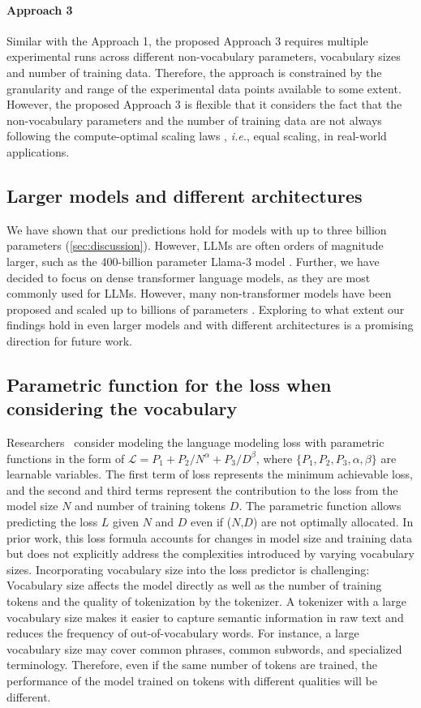 \paragraph{Approach 3}
Similar with the Approach 1, the proposed Approach 3 requires multiple experimental runs across different non-vocabulary parameters, vocabulary sizes and number of training data. Therefore, the approach is constrained by the granularity and range of the experimental data points available to some extent. However, the proposed Approach 3 is flexible that it considers the fact that the non-vocabulary parameters and the number of training data are not always following the compute-optimal scaling laws \citep{hoffmann2022training}, \textit{i.e.}, equal scaling, in real-world applications.

\subsection{Larger models and different architectures}

We have shown that our predictions hold for models with up to three billion parameters (\autoref{sec:discussion}). However, LLMs are often orders of magnitude larger, such as the 400-billion parameter Llama-3 model \cite{metallama3blog}. Further, we have decided to focus on dense transformer language models, as they are most commonly used for LLMs. However, many non-transformer models have been proposed and scaled up to billions of parameters \cite{peng2023rwkv,peng2024eagle}. Exploring to what extent our findings hold in even larger models and with different architectures is a promising direction for future work.

\subsection{Parametric function for the loss when considering the vocabulary}
Researchers~\citep{hoffmann2022training,muennighoff2024scaling} consider modeling the language modeling loss with parametric functions in the form of $\mathcal{L}=P_1+P_2/N^{\alpha}+P_3/D^{\beta}$, where $\{P_1,P_2,P_3,\alpha,\beta\}$ are learnable variables. The first term of loss represents the minimum achievable loss, and the second and third terms represent the contribution to the loss from the model size $N$ and number of training tokens $D$. The parametric function allows predicting the loss $L$ given $N$ and $D$ even if ($N$,$D$) are not optimally allocated. In prior work, this loss formula accounts for changes in model size and training data but does not explicitly address the complexities introduced by varying vocabulary sizes. Incorporating vocabulary size into the loss predictor is challenging: Vocabulary size affects the model directly as well as the number of training tokens and the quality of tokenization by the tokenizer. A tokenizer with a large vocabulary size makes it easier to capture semantic information in raw text and reduces the frequency of out-of-vocabulary words. For instance, a large vocabulary size may cover common phrases, common subwords, and specialized terminology. Therefore, even if the same number of tokens are trained, the performance of the model trained on tokens with different qualities will be different.

